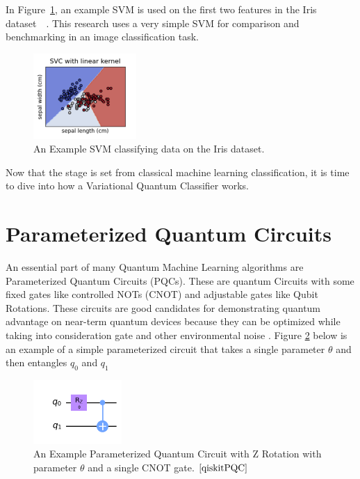 \documentclass[11pt]{article}
\begin{document}
In Figure~\ref{fig:svm-classical}, an example SVM is used on the first two features in the Iris dataset~\cite{sklearnsvm}~\cite{sklearndata}.
This research uses a very simple SVM for comparison and benchmarking in an image classification task.
\begin{figure}[!h]
    \centering
    \includegraphics[width=0.35\textwidth]{./figures/svm_classical_example.png} 
    \caption{An Example SVM classifying data on the Iris dataset.}\label{fig:svm-classical}
\end{figure}

Now that the stage is set from classical machine learning classification, it is time to dive into how a Variational
 Quantum Classifier works.


\section{Parameterized Quantum Circuits}\label{vqcircuits}

An essential part of many Quantum Machine Learning algorithms are Parameterized Quantum Circuits (PQCs). These are quantum Circuits
with some fixed gates like controlled NOTs (CNOT) and adjustable gates like Qubit Rotations. These circuits are good candidates
for demonstrating quantum advantage on near-term quantum devices because they can be optimized while taking into consideration gate
and other environmental noise \cite{Benedetti_2019}. Figure \ref{fig:pqc-dummy} 
below is an example of a simple parameterized circuit that takes a single parameter $\theta$ and then entangles $q_0$ and $q_1$


\begin{figure}[!h]
    \centering
    \includegraphics[width=0.3\textwidth]{./figures/pqc_example.png} 
    \caption{An Example Parameterized Quantum Circuit with Z Rotation with parameter $\theta $ and a single CNOT gate. 
    $\cite{qiskitPQC}$ }\label{fig:pqc-dummy}
\end{figure}
\end{document}
